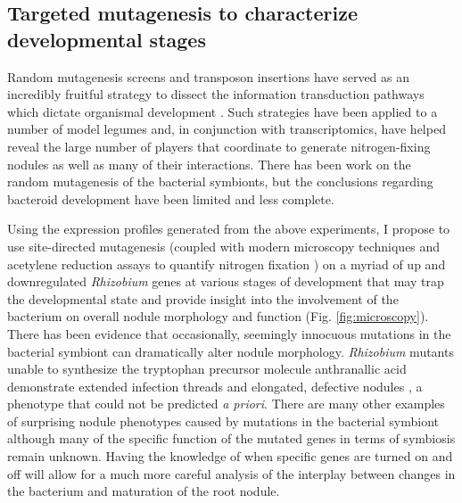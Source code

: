 \subsection*{Targeted mutagenesis to characterize developmental stages}
\indent Random mutagenesis screens and transposon insertions have served as an
incredibly fruitful strategy to dissect the information transduction pathways
which dictate organismal development \cite{Sikora:2011fk, Flibotte:2010fc}. Such
strategies have been applied to a number of model legumes and, in conjunction
with transcriptomics, have helped reveal the large number of players that
coordinate to generate nitrogen-fixing nodules as well as many of their
interactions. There has been work on the random mutagenesis of the bacterial
symbionts, but the conclusions regarding bacteroid development have been limited
and less complete. 

Using the expression profiles generated from the above experiments, I propose to
use site-directed mutagenesis  (coupled with modern microscopy techniques and
acetylene reduction assays to quantify nitrogen fixation \cite{Vessey:1994vc}) on a
myriad of up and downregulated \textit{Rhizobium} genes at various stages of
development that may trap the developmental state and provide insight into the
involvement of the bacterium on overall nodule morphology and function (Fig.
\ref{fig:microscopy}). There has been evidence that occasionally, seemingly
innocuous mutations in the bacterial symbiont can dramatically alter nodule
morphology. \textit{Rhizobium} mutants unable to synthesize the tryptophan
precursor molecule anthranallic acid demonstrate extended infection threads and
elongated, defective nodules \cite{Barsomian:1991uc}, a phenotype that could not
be predicted \textit{a priori}. There are many other examples of surprising
nodule phenotypes caused by mutations in the bacterial symbiont although many of
the specific function of the mutated genes in terms of symbiosis remain unknown.
Having the knowledge of when specific genes are
turned on and off will allow for a much more careful analysis of the interplay
between changes in the bacterium and maturation of the root nodule.


